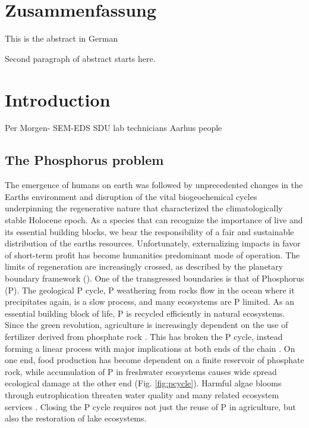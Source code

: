 \documentclass[12pt,twoside]{book}
\newenvironment{zusammenfassung}{
  \chapter*{Zusammenfassung}
  \addcontentsline{toc}{chapter}{Zusammenfassung}
}{\clearpage}
\begin{document}
  \begin{zusammenfassung}
  This is the abstract in German

  \par

  Second paragraph of abstract starts here.
  \end{zusammenfassung}

\mainmatter
\pagestyle{fancy}

\chapter{Introduction}\label{Intro}

Per Morgen- SEM-EDS
SDU lab technicians
Aarhus people

\section{The Phosphorus problem}\label{the-phosphorus-problem}

The emergence of humans on earth was followed by unprecedented changes in the Earths environment and disruption of the vital biogeochemical cycles underpinning the regenerative nature that characterized the climatologically stable Holocene epoch. As a species that can recognize the importance of live and its essential building blocks, we bear the responsibility of a fair and sustainable distribution of the earths resources. Unfortunately, externalizing impacts in favor of short-term profit has become humanities predominant mode of operation. The limits of regeneration are increasingly crossed, as described by the planetary boundary framework (\citep{Richardson2023}). One of the transgressed boundaries is that of Phosphorus (P). The geological P cycle, P weathering from rocks flow in the ocean where it precipitates again, is a slow process, and many ecosystems are P limited. As an essential building block of life, P is recycled efficiently in natural ecosystems. Since the green revolution, agriculture is increasingly dependent on the use of fertilizer derived from phosphate rock \citep{Ashley2011}. This has broken the P cycle, instead forming a linear process with major implications at both ends of the chain \citep{Cordell2010}. On one end, food production has become dependent on a finite reservoir of phosphate rock, while accumulation of P in freshwater ecosystems causes wide spread ecological damage at the other end (Fig. \ref{fig:pcycle}). Harmful algae blooms through eutrophication threaten water quality and many related ecosystem services \citep{Ansari2014}. Closing the P cycle requires not just the reuse of P in agriculture, but also the restoration of lake ecosystems.
\end{document}
